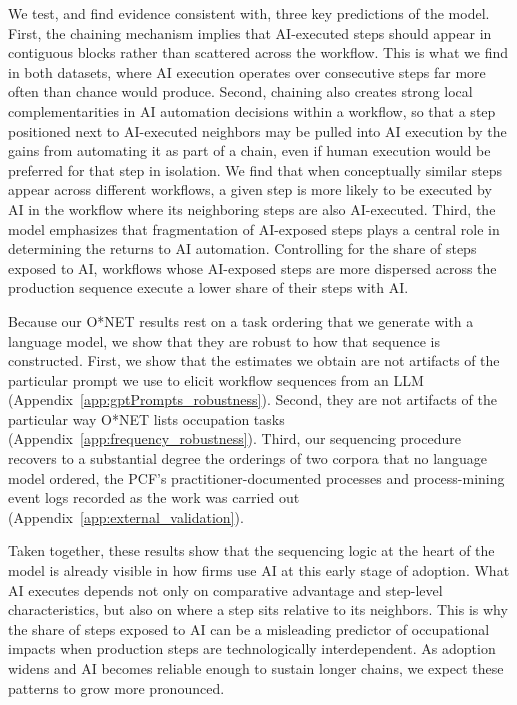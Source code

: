 We test, and find evidence consistent with, three key predictions of the model.
First, the chaining mechanism implies that AI-executed steps should appear in contiguous blocks rather than scattered across the workflow.
This is what we find in both datasets, where AI execution operates over consecutive steps far more often than chance would produce.
Second, chaining also creates strong local complementarities in AI automation decisions within a workflow, so that a step positioned next to AI-executed neighbors may be pulled into AI execution by the gains from automating it as part of a chain, even if human execution would be preferred for that step in isolation.
We find that when conceptually similar steps appear across different workflows, a given step is more likely to be executed by AI in the workflow where its neighboring steps are also AI-executed.
Third, the model emphasizes that fragmentation of AI-exposed steps plays a central role in determining the returns to AI automation.
Controlling for the share of steps exposed to AI, workflows whose AI-exposed steps are more dispersed across the production sequence execute a lower share of their steps with AI.

Because our O*NET results rest on a task ordering that we generate with a language model, we show that they are robust to how that sequence is constructed.
First, we show that the estimates we obtain are not artifacts of the particular prompt we use to elicit workflow sequences from an LLM (Appendix~\ref{app:gptPrompts_robustness}).
Second, they are not artifacts of the particular way O*NET lists occupation tasks (Appendix~\ref{app:frequency_robustness}).
Third, our sequencing procedure recovers to a substantial degree the orderings of two corpora that no language model ordered, the PCF's practitioner-documented processes and process-mining event logs recorded as the work was carried out (Appendix~\ref{app:external_validation}).

Taken together, these results show that the sequencing logic at the heart of the model is already visible in how firms use AI at this early stage of adoption.
What AI executes depends not only on comparative advantage and step-level characteristics, but also on where a step sits relative to its neighbors.
This is why the share of steps exposed to AI can be a misleading predictor of occupational impacts when production steps are technologically interdependent.
As adoption widens and AI becomes reliable enough to sustain longer chains, we expect these patterns to grow more pronounced.
